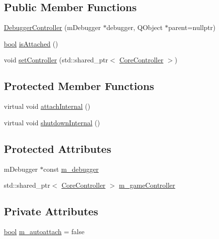 \subsection*{Public Member Functions}
\begin{DoxyCompactItemize}
\item 
\mbox{\hyperlink{class_q_g_b_a_1_1_debugger_controller_a39f982b474a5edd9ef6172086ddcb67c}{Debugger\+Controller}} (m\+Debugger $\ast$debugger, Q\+Object $\ast$parent=nullptr)
\item 
\mbox{\hyperlink{libretro_8h_a4a26dcae73fb7e1528214a068aca317e}{bool}} \mbox{\hyperlink{class_q_g_b_a_1_1_debugger_controller_aed5edc4c60b5c87a2a37c29079665f03}{is\+Attached}} ()
\item 
void \mbox{\hyperlink{class_q_g_b_a_1_1_debugger_controller_a6be5bfa5408023233de61151d4697519}{set\+Controller}} (std\+::shared\+\_\+ptr$<$ \mbox{\hyperlink{class_q_g_b_a_1_1_core_controller}{Core\+Controller}} $>$)
\end{DoxyCompactItemize}
\subsection*{Protected Member Functions}
\begin{DoxyCompactItemize}
\item 
virtual void \mbox{\hyperlink{class_q_g_b_a_1_1_debugger_controller_a51748923ae90a2a2f1a5b9dc920f3a37}{attach\+Internal}} ()
\item 
virtual void \mbox{\hyperlink{class_q_g_b_a_1_1_debugger_controller_ade3fbd859c3e94ccfe057f5bb92ae054}{shutdown\+Internal}} ()
\end{DoxyCompactItemize}
\subsection*{Protected Attributes}
\begin{DoxyCompactItemize}
\item 
m\+Debugger $\ast$const \mbox{\hyperlink{class_q_g_b_a_1_1_debugger_controller_abca4ca1694172c591f1775c1474860bd}{m\+\_\+debugger}}
\item 
std\+::shared\+\_\+ptr$<$ \mbox{\hyperlink{class_q_g_b_a_1_1_core_controller}{Core\+Controller}} $>$ \mbox{\hyperlink{class_q_g_b_a_1_1_debugger_controller_a3a94e6e924d5cd9a4254cb7bd5423d2f}{m\+\_\+game\+Controller}}
\end{DoxyCompactItemize}
\subsection*{Private Attributes}
\begin{DoxyCompactItemize}
\item 
\mbox{\hyperlink{libretro_8h_a4a26dcae73fb7e1528214a068aca317e}{bool}} \mbox{\hyperlink{class_q_g_b_a_1_1_debugger_controller_af2c71181089173e97a713749cde93add}{m\+\_\+autoattach}} = false
\end{DoxyCompactItemize}


